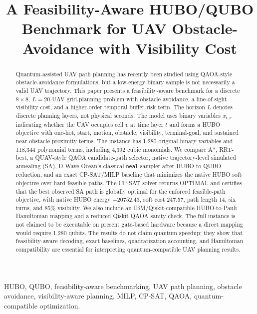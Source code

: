 \documentclass[10pt,conference]{IEEEtran}
\title{A Feasibility-Aware HUBO/QUBO Benchmark for UAV Obstacle-Avoidance with Visibility Cost}
\author{\IEEEauthorblockN{Author names to be finalized}
\IEEEauthorblockA{Affiliations to be finalized\\
Email: to be finalized}}
\begin{document}
\maketitle

\begin{abstract}
Quantum-assisted UAV path planning has recently been studied using QAOA-style obstacle-avoidance formulations, but a low-energy binary sample is not necessarily a valid UAV trajectory. This paper presents a feasibility-aware benchmark for a discrete $8\times8$, $L=20$ UAV grid-planning problem with obstacle avoidance, a line-of-sight visibility cost, and a higher-order temporal buffer-risk term. The horizon $L$ denotes discrete planning layers, not physical seconds. The model uses binary variables $x_{t,v}$ indicating whether the UAV occupies cell $v$ at time layer $t$ and forms a HUBO objective with one-hot, start, motion, obstacle, visibility, terminal-goal, and sustained near-obstacle proximity terms. The instance has 1,280 original binary variables and 118,344 polynomial terms, including 4,392 cubic monomials. We compare A*, RRT-best, a QUAV-style QAOA candidate-path selector, native trajectory-level simulated annealing (SA), D-Wave Ocean's classical \texttt{neal} sampler after HUBO-to-QUBO reduction, and an exact CP-SAT/MILP baseline that minimizes the native HUBO soft objective over hard-feasible paths. The CP-SAT solver returns OPTIMAL and certifies that the best observed SA path is globally optimal for the enforced feasible-path objective, with native HUBO energy $-20752.43$, soft cost 247.57, path length 14, six turns, and 85\% visibility. We also include an IBM/Qiskit-compatible HUBO-to-Pauli Hamiltonian mapping and a reduced Qiskit QAOA sanity check. The full instance is not claimed to be executable on present gate-based hardware because a direct mapping would require 1,280 qubits. The results do not claim quantum speedup; they show that feasibility-aware decoding, exact baselines, quadratization accounting, and Hamiltonian compatibility are essential for interpreting quantum-compatible UAV planning results.
\end{abstract}

\begin{IEEEkeywords}
HUBO, QUBO, feasibility-aware benchmarking, UAV path planning, obstacle avoidance, visibility-aware planning, MILP, CP-SAT, QAOA, quantum-compatible optimization.
\end{IEEEkeywords}
\end{document}
